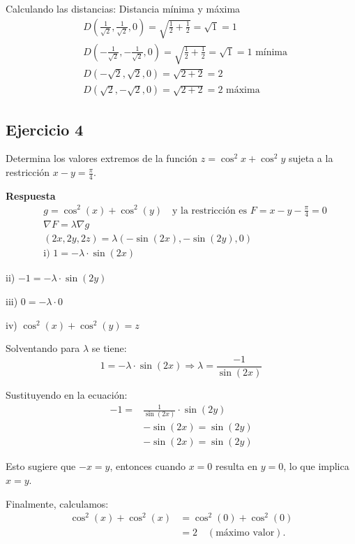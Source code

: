 \documentclass{report}
\begin{document}
Calculando las distancias:
Distancia mínima y máxima
$$
\begin{aligned}
& D\left(\frac{1}{\sqrt{2}}, \frac{1}{\sqrt{2}}, 0\right) = \sqrt{\frac{1}{2} + \frac{1}{2}} = \sqrt{1} = 1 \\
& D\left(-\frac{1}{\sqrt{2}},-\frac{1}{\sqrt{2}}, 0\right) = \sqrt{\frac{1}{2} + \frac{1}{2}} = \sqrt{1} = 1 \text{ mínima} \\
& D(-\sqrt{2}, \sqrt{2}, 0) = \sqrt{2 + 2} = 2 \\
& D(\sqrt{2},-\sqrt{2}, 0) = \sqrt{2 + 2} = 2 \text{ máxima} 
\end{aligned}
$$
\subsection{Ejercicio 4}
Determina los valores extremos de la función $z = \cos^2 x + \cos^2 y$ sujeta a la restricción $x - y = \frac{\pi}{4}$.

\textbf{Respuesta}
$$
\begin{aligned}
& g = \cos^2(x) + \cos^2(y) \quad \text{y la restricción es } F = x-y-\frac{\pi}{4}=0 \\
& \nabla F = \lambda \nabla g \\
& (2 x, 2 y, 2 z) = \lambda (-\sin(2 x), -\sin(2 y), 0) \\
& \text{i) } 1 = -\lambda \cdot \sin(2 x)
\end{aligned}
$$

ii) $-1 = -\lambda \cdot \sin(2 y)$

iii) $0 = -\lambda \cdot 0$

iv) $\cos^2(x) + \cos^2(y) = z$

Solventando para $\lambda$ se tiene:
$$
1 = -\lambda \cdot \sin(2 x) \Rightarrow \lambda = \frac{-1}{\sin(2 x)}
$$

Sustituyendo en la ecuación:
$$
\begin{aligned}
-1 = & \frac{1}{\sin(2 x)} \cdot \sin(2 y) \\
& -\sin(2 x) = \sin(2 y) \\
& -\sin(2 x) = \sin(2 y)
\end{aligned}
$$

Esto sugiere que $-x = y$, entonces cuando $x = 0$ resulta en $y = 0$, lo que implica $x = y$.

Finalmente, calculamos:
$$
\begin{aligned}
\cos^2(x) + \cos^2(x) & = \cos^2(0) + \cos^2(0) \\
& = 2 \quad (\text{máximo valor}).
\end{aligned}
$$
\end{document}
